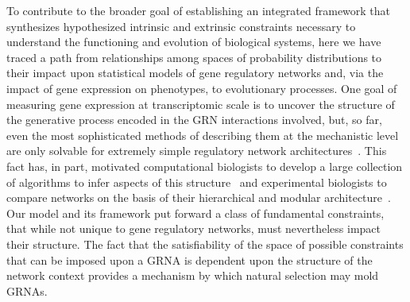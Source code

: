 To contribute to the broader goal of establishing an integrated framework that synthesizes hypothesized intrinsic and extrinsic constraints necessary to understand the functioning and evolution of biological systems, here we have traced a path from relationships among spaces of probability distributions to their impact upon statistical models of gene regulatory networks and, via the impact of gene expression on phenotypes, to evolutionary processes. One goal of measuring gene expression at transcriptomic scale is to uncover the structure of the generative process encoded in the GRN interactions involved, but, so far, even the most sophisticated methods of describing them at the mechanistic level are only solvable for extremely simple regulatory network architectures~\cite{Walczak2009,Mugler2009}. This fact has, in part, motivated computational biologists to develop a large collection of algorithms to infer aspects of this structure~\cite{DeSmet2010} and experimental biologists to compare networks on the basis of their hierarchical and modular architecture~\cite{Ideker2012}. Our model and its framework put forward a class of fundamental constraints, that while not unique to gene regulatory networks, must nevertheless impact their structure. The fact that the satisfiability of the space of possible constraints that can be imposed upon a GRNA is dependent upon the structure of the network context provides a mechanism by which natural selection may mold GRNAs.

